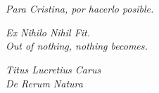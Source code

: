 
\chapter*{}
\vspace{120pt}
\epigraph{\textit{Para Cristina, por hacerlo posible.}}{}
\vspace{90pt}
\epigraph{\textit{Ex Nihilo Nihil Fit.\\
Out of nothing, nothing becomes.}}{\textit{Titus Lucretius Carus\\De Rerum Natura}}
